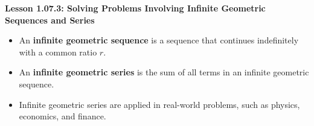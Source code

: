 \begin{center}
\textbf{Lesson 1.07.3: Solving Problems Involving Infinite Geometric Sequences and Series}
\end{center}

\vspace*{-1.5ex}

\begin{itemize}
    \item An \textbf{infinite geometric sequence} is a sequence that continues indefinitely with a common ratio \(r\).
    \item An \textbf{infinite geometric series} is the sum of all terms in an infinite geometric sequence.
    \item Infinite geometric series are applied in real-world problems, such as physics, economics, and finance.
\end{itemize}
